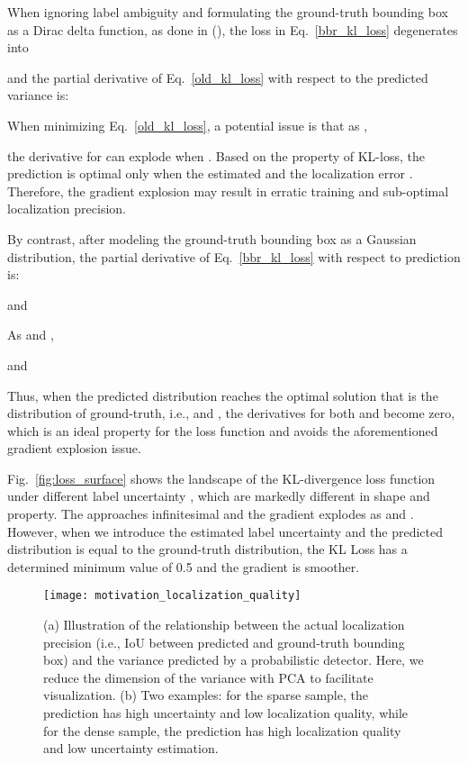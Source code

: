 \documentclass[twocolumn]{svjour3}
\begin{document}
When ignoring label ambiguity and formulating the ground-truth bounding box as a Dirac delta function, as done in (\cite{bbr}), the loss in Eq.~\eqref{bbr_kl_loss} degenerates into

and the partial derivative of Eq.~\eqref{old_kl_loss} with respect to the predicted variance  is:

When minimizing Eq.~\eqref{old_kl_loss}, a potential issue is that as ,

the derivative for  can explode when .
Based on the property of KL-loss, the prediction is optimal only when the estimated  and the localization error .
Therefore, the gradient explosion may result in erratic training and sub-optimal localization precision.

By contrast, after modeling the ground-truth bounding box as a Gaussian distribution, the partial derivative of Eq.~\eqref{bbr_kl_loss} with respect to prediction is:

and

As  and ,

and

Thus, when the predicted distribution reaches the optimal solution that is the distribution of ground-truth, i.e.,  and , the derivatives for both  and  become zero, which is an ideal property for the loss function and avoids the aforementioned gradient explosion issue.

Fig.~\ref{fig:loss_surface} shows the landscape of the KL-divergence loss function under different label uncertainty , which are markedly different in shape and property. 
The  approaches infinitesimal and the gradient explodes as  and . However, when we introduce the estimated label uncertainty and the predicted distribution is equal to the ground-truth distribution, the KL Loss has a determined minimum value of 0.5 and the gradient is smoother.

\begin{figure*}[htp]
\centering
\texttt{[image: motivation\_localization\_quality]} \caption{(a) Illustration of the relationship between the actual localization precision (i.e., IoU between predicted and ground-truth bounding box) and the variance predicted by a probabilistic detector. Here, we reduce the dimension of the variance with PCA to facilitate visualization. (b) Two examples: for the sparse sample, the prediction has high uncertainty and low localization quality, while for the dense sample, the prediction has high localization quality and low uncertainty estimation.}
\label{fig:motivation_quality}
\end{figure*}
\end{document}
